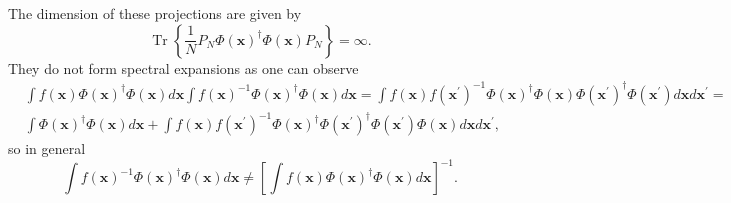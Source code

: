 \documentclass[aps,preprint]{revtex4}%
\begin{document}
The dimension of these projections are given by
\begin{equation}
\operatorname{Tr}\left\{  \frac{1}{N}P_{N}\Phi\left(  \mathbf{x}\right)
^{\dagger}\Phi\left(  \mathbf{x}\right)  P_{N}\right\}  =\infty.
\end{equation}
They do not form spectral expansions as one can observe
\begin{align}
&  \int f\left(  \mathbf{x}\right)  \Phi\left(  \mathbf{x}\right)  ^{\dagger
}\Phi\left(  \mathbf{x}\right)  d\mathbf{x}\int f\left(  \mathbf{x}\right)
^{-1}\Phi\left(  \mathbf{x}\right)  ^{\dagger}\Phi\left(  \mathbf{x}\right)
d\mathbf{x=}\int f\left(  \mathbf{x}\right)  f\left(  \mathbf{x}^{\prime
}\right)  ^{-1}\Phi\left(  \mathbf{x}\right)  ^{\dagger}\Phi\left(
\mathbf{x}\right)  \Phi\left(  \mathbf{x}^{\prime}\right)  ^{\dagger}%
\Phi\left(  \mathbf{x}^{\prime}\right)  d\mathbf{x}d\mathbf{x}^{\prime
}=\nonumber\\
&  \int\Phi\left(  \mathbf{x}\right)  ^{\dagger}\Phi\left(  \mathbf{x}\right)
d\mathbf{x+}\int f\left(  \mathbf{x}\right)  f\left(  \mathbf{x}^{\prime
}\right)  ^{-1}\Phi\left(  \mathbf{x}\right)  ^{\dagger}\Phi\left(
\mathbf{x}^{\prime}\right)  ^{\dagger}\Phi\left(  \mathbf{x}^{\prime}\right)
\Phi\left(  \mathbf{x}\right)  d\mathbf{x}d\mathbf{x}^{\prime},
\end{align}
so in general
\begin{equation}
\int f\left(  \mathbf{x}\right)  ^{-1}\Phi\left(  \mathbf{x}\right)
^{\dagger}\Phi\left(  \mathbf{x}\right)  d\mathbf{x\neq}\left[  \int f\left(
\mathbf{x}\right)  \Phi\left(  \mathbf{x}\right)  ^{\dagger}\Phi\left(
\mathbf{x}\right)  d\mathbf{x}\right]  ^{-1}.
\end{equation}
\end{document}
